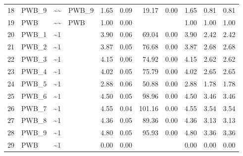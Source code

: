 \documentclass{article}
\begin{document}
\begin{table}[ht]
\begin{tabular}{rlllrrrrrrr}
  18 & PWB\_9 & \~{}\~{} & PWB\_9 & 1.65 & 0.09 & 19.17 & 0.00 & 1.65 & 0.81 & 0.81 \\ 
  19 & PWB & \~{}\~{} & PWB & 1.00 & 0.00 &  &  & 1.00 & 1.00 & 1.00 \\ 
  20 & PWB\_1 & \~{}1 &  & 3.90 & 0.06 & 69.04 & 0.00 & 3.90 & 2.42 & 2.42 \\ 
  21 & PWB\_2 & \~{}1 &  & 3.87 & 0.05 & 76.68 & 0.00 & 3.87 & 2.68 & 2.68 \\ 
  22 & PWB\_3 & \~{}1 &  & 4.15 & 0.06 & 74.92 & 0.00 & 4.15 & 2.62 & 2.62 \\ 
  23 & PWB\_4 & \~{}1 &  & 4.02 & 0.05 & 75.79 & 0.00 & 4.02 & 2.65 & 2.65 \\ 
  24 & PWB\_5 & \~{}1 &  & 2.88 & 0.06 & 50.88 & 0.00 & 2.88 & 1.78 & 1.78 \\ 
  25 & PWB\_6 & \~{}1 &  & 4.50 & 0.05 & 98.96 & 0.00 & 4.50 & 3.46 & 3.46 \\ 
  26 & PWB\_7 & \~{}1 &  & 4.55 & 0.04 & 101.16 & 0.00 & 4.55 & 3.54 & 3.54 \\ 
  27 & PWB\_8 & \~{}1 &  & 4.36 & 0.05 & 89.36 & 0.00 & 4.36 & 3.13 & 3.13 \\ 
  28 & PWB\_9 & \~{}1 &  & 4.80 & 0.05 & 95.93 & 0.00 & 4.80 & 3.36 & 3.36 \\ 
  29 & PWB & \~{}1 &  & 0.00 & 0.00 &  &  & 0.00 & 0.00 & 0.00 \\ 
   \hline
\end{tabular}
\end{table}
\end{document}
